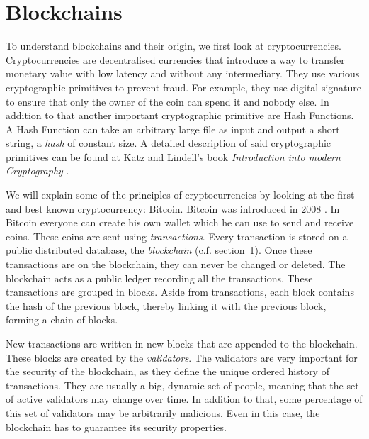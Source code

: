 \documentclass{cacthesis}
\begin{document}
\section{Blockchains}
\label{sec:blockchain}
To understand blockchains and their origin, we first look at cryptocurrencies.
Cryptocurrencies are decentralised currencies that introduce a way to transfer monetary value with low latency and without any intermediary. They use various cryptographic primitives to prevent fraud. For example, they use digital signature to ensure that only the owner of the coin can spend it and nobody else. In addition to that another important cryptographic primitive are Hash Functions. A Hash Function can take an arbitrary large file as input and output a short string, a \emph{hash} of constant size. 
A detailed description of said cryptographic primitives can be found at Katz and Lindell's book \emph{Introduction into modern Cryptography} \cite{Katz2020-aj}. \newline

We will explain some of the principles of cryptocurrencies by looking at the first and best known cryptocurrency: Bitcoin. Bitcoin was introduced in 2008 \cite{nakamoto_bitcoin_nodate}. In Bitcoin everyone can create his own wallet which he can use to send and receive coins. These coins are sent using \emph{transactions}. Every transaction is stored on a public distributed database, the \emph{blockchain} (c.f. section~\ref{sec:blockchain}). Once these transactions are on the blockchain, they can never be changed or deleted. The blockchain acts as a public ledger recording all the transactions.
These transactions are grouped in blocks. Aside from transactions, each block contains the hash of the previous block, thereby linking it with the previous block, forming a chain of blocks.\newline

New transactions are written in new blocks that are appended to the blockchain.  These blocks are created by the \emph{validators}.
The validators are very important for the security of the blockchain, as they define the unique ordered history of transactions. They are usually a big, dynamic set of people, meaning that the set of active validators may change over time. In addition to that, some percentage of this set of validators may be arbitrarily malicious. Even in this case, the blockchain has to guarantee its security properties.\newline
\end{document}
